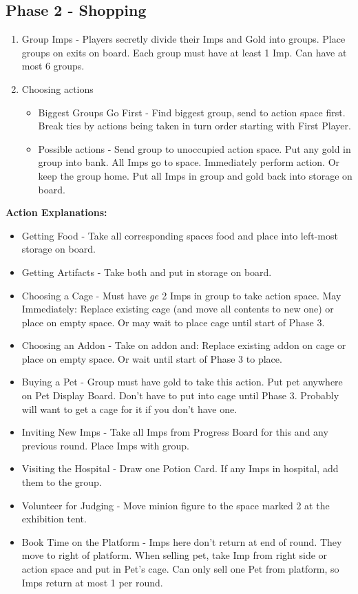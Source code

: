 \documentclass[12pt]{article}
\newenvironment{enumerateCustom}
{\begin{enumerate}
  \setlength{\itemsep}{1pt}
  \setlength{\parskip}{0pt}
  \setlength{\parsep}{0pt}}
{\end{enumerate}}
\newenvironment{itemizeCustom}
{\begin{itemize}
  \setlength{\itemsep}{1pt}
  \setlength{\parskip}{0pt}
  \setlength{\parsep}{0pt}}
{\end{itemize}}
\begin{document}
\begin{multicols*}{2}
\subsection*{Phase 2 - Shopping}
\begin{enumerateCustom}
	\item Group Imps - Players secretly divide their Imps and Gold into groups. Place groups on exits on board. Each group must have at least 1 Imp. Can have at most 6 groups.
	\item Choosing actions
		\begin{itemizeCustom}
			\item Biggest Groups Go First - Find biggest group, send to action space first. Break ties by actions being taken in turn order starting with First Player.
			\item Possible actions - Send group to unoccupied action space. Put any gold in group into bank. All Imps go to space. Immediately perform action. Or keep the group home. Put all Imps in group and gold back into storage on board.
		\end{itemizeCustom}
\end{enumerateCustom}

\textbf{Action Explanations:}
\begin{itemizeCustom}
	\item Getting Food - Take all corresponding spaces food and place into left-most storage on board.
	\item Getting Artifacts - Take both and put in storage on board.
	\item Choosing a Cage - Must have $ge$ 2 Imps in group to take action space. May Immediately: Replace existing cage (and move all contents to new one) or place on empty space. Or may wait to place cage until start of Phase 3.
	\item Choosing an Addon - Take on addon and: Replace existing addon on cage or place on empty space. Or wait until start of Phase 3 to place.
	\item Buying a Pet - Group must have gold to take this action. Put pet anywhere on Pet Display Board. Don't have to put into cage until Phase 3. Probably will want to get a cage for it if you don't have one.
	\item Inviting New Imps - Take all Imps from Progress Board for this and any previous round. Place Imps with group.
	\item Visiting the Hospital - Draw one Potion Card. If any Imps in hospital, add them to the group.
	\item Volunteer for Judging - Move minion figure to the space marked 2 at the exhibition tent.
	\item Book Time on the Platform - Imps here don't return at end of round. They move to right of platform. When selling pet, take Imp from right side or action space and put in Pet's cage. Can only sell one Pet from platform, so Imps return at most 1 per round.
\end{itemizeCustom}


\end{multicols*}
\end{document}
